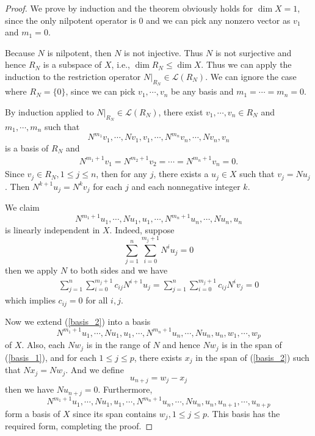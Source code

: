 \documentclass[11pt]{book}
\theoremstyle{definition}
\numberwithin{equation}{chapter}
\begin{document}
\begin{proof}
We prove by induction and the theorem obviously holds for $\dim X = 1$, since the only nilpotent operator is $0$ and we can pick any nonzero vector as $v_1$ and $m_1 = 0$. 

Because $N$ is nilpotent, then $N$ is not injective. Thus $N$ is not surjective and hence $R_N$ is a subspace of $X$, i.e., $\dim R_N \leq \dim X$. Thus we can apply the induction to the restriction operator $N|_{R_N}\in\mathcal{L}(R_N)$. We can ignore the case where $R_N = \{0\}$, since we can pick $v_1,\cdots,v_n$ be any basis and $m_1 = \cdots = m_n = 0$. 

By induction applied to $N|_{R_N}\in\mathcal{L}(R_N)$, there exist $v_1,\cdots,v_n\in R_N$ and $m_1,\cdots,m_n$ such that 
\begin{equation}\label{basis_1}
    N^{m_1}v_1, \cdots, Nv_1, v_1, \cdots, N^{m_n}v_n, \cdots, N v_n, v_n
\end{equation}
is a basis of $R_N$ and 
\begin{align*}
    N^{m_1+1}v_1 = N^{m_2+1}v_2 = \cdots = N^{m_n+1}v_n = 0.
\end{align*}
Since $v_j\in R_N, 1\leq j \leq n$, then for any $j$, there exists a $u_j\in X$ such that $v_j = Nu_j$. Then $N^{k+1}u_j = N^k v_j$ for each $j$ and each nonnegative integer $k$. 

We claim 
\begin{equation}\label{basis_2}
    N^{m_1+1}u_1, \cdots, Nu_1, u_1, \cdots, N^{m_n+1}u_n, \cdots, N u_n, u_n
\end{equation}
is linearly independent in $X$. Indeed, suppose $$\sum^n_{j=1}\sum^{m_j+1}_{i=0}N^{i}u_j = 0$$
then we apply $N$ to both sides and we have
\begin{align*}
    \sum^n_{j=1}\sum^{m_j+1}_{i=0}c_{ij}N^{i+1}u_j = \sum^n_{j=1}\sum^{m_j+1}_{i=0}c_{ij}N^{i}v_j = 0
\end{align*}
which implies $c_{ij} = 0$ for all $i,j$.

Now we extend (\ref{basis_2}) into a basis 
\begin{equation}\label{basis_3}
    N^{m_1+1}u_1, \cdots, Nu_1, u_1, \cdots, N^{m_n+1}u_n, \cdots, N u_n, u_n, w_1,\cdots, w_p
\end{equation}
of $X$. Also, each $Nw_j$ is in the range of $N$ and hence $Nw_j$ is in the span of (\ref{basis_1}), and for each $1\leq j\leq p$, there exists $x_j$ in the span of (\ref{basis_2}) such that $Nx_j = Nw_j$. And we define 
$$u_{n+j} = w_j - x_j$$
then we have $Nu_{n+j} = 0$. Furthermore, 
\begin{equation}\label{basis_4}
    N^{m_1+1}u_1, \cdots, Nu_1, u_1, \cdots, N^{m_n+1}u_n, \cdots, N u_n, u_n, u_{n+1},\cdots, u_{n+p}
\end{equation}
form a basis of $X$ since its span contains $w_j, 1\leq j\leq p$. This basis has the required form, completing the proof.
\end{proof}
\end{document}
